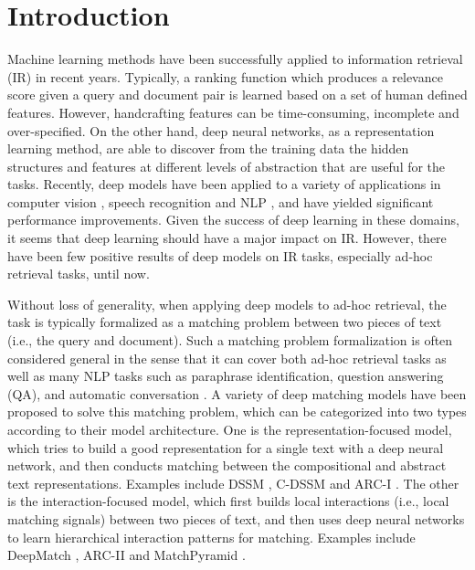 \documentclass{sig-alternate-05-2015}
\begin{document}

\section{Introduction}
Machine learning methods have been successfully applied to information retrieval (IR) in recent years. Typically, a ranking function which produces a relevance score given a query and document pair is learned based on a set of human defined features. However, handcrafting features can be time-consuming, incomplete and over-specified. On the other hand, deep neural networks, as a representation learning method, are able to discover from the training data the hidden structures and features at different levels of abstraction that are useful for the tasks. Recently, deep models have been applied to a variety of applications in computer vision \cite{lecun1995convolutional}, speech recognition \cite{hinton2012deep} and NLP \cite{socher2011dynamic,lu2013deep}, and have yielded significant performance improvements. Given the success of deep learning in these domains, it seems that deep learning should have a major impact on IR. However, there have been few positive results of deep models on IR tasks, especially ad-hoc retrieval tasks, until now.

Without loss of generality, when applying deep models to ad-hoc retrieval, the task is typically formalized as a matching problem between two pieces of text (i.e., the query and document). Such a matching problem formalization is often considered general in the sense that it can cover both ad-hoc retrieval tasks as well as many NLP tasks such as paraphrase identification, question answering (QA), and automatic conversation \cite{lu2013deep,hu2014convolutional}. A variety of deep matching models have been proposed to solve this matching problem, which can be categorized into two types according to their model architecture. One is the representation-focused model, which tries to build a good representation for a single text with a deep neural network, and then conducts matching between the compositional and abstract text representations. Examples include DSSM \cite{huang2013learning}, C-DSSM \cite{shen2014learning,gao2015modeling} and ARC-I \cite{hu2014convolutional}. The other is the interaction-focused model, which first builds local interactions (i.e., local matching signals) between two pieces of text, and then uses deep neural networks to learn hierarchical interaction patterns for matching. Examples include DeepMatch \cite{lu2013deep}, ARC-II \cite{hu2014convolutional} and MatchPyramid \cite{pang2016text}.
\end{document}

